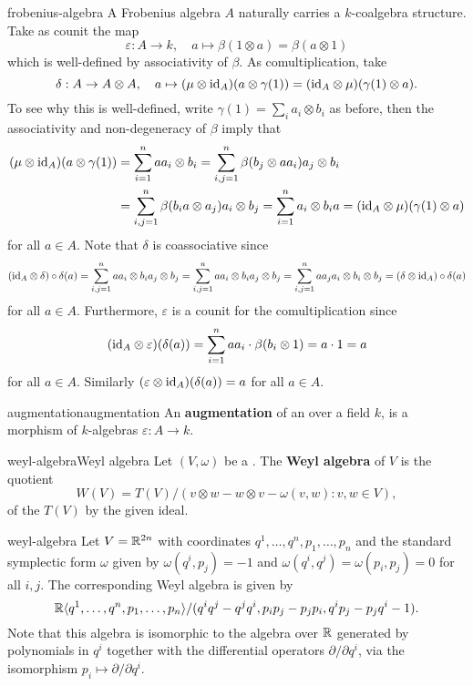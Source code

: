 \begin{example}{frobenius-algebra}
    A Frobenius algebra $A$ naturally carries a $k$-coalgebra structure. Take as counit the map
    \[ \varepsilon : A \to k, \quad a \mapsto \beta(1 \otimes a) = \beta(a \otimes 1) \]
    which is well-defined by associativity of $\beta$. As comultiplication, take
    \[ \delta : A \to A \otimes A, \quad a \mapsto (\mu \otimes \text{id}_A)(a \otimes \gamma(1)) = (\text{id}_A \otimes \mu)(\gamma(1) \otimes a) . \]
    To see why this is well-defined, write $\gamma(1) = \sum_i a_i \otimes b_i$ as before, then the associativity and non-degeneracy of $\beta$ imply that
    \[ \begin{aligned}
        (\mu \otimes \text{id}_A)(a \otimes \gamma(1)) &= \sum_{i = 1}^{n} a a_i \otimes b_i = \sum_{i,j = 1}^{n} \beta(b_j \otimes a a_i) a_j \otimes b_i \\ &= \sum_{i,j = 1}^{n} \beta(b_i a \otimes a_j) a_i \otimes b_j = \sum_{i = 1}^{n} a_i \otimes b_i a = (\text{id}_A \otimes \mu)(\gamma(1) \otimes a) 
    \end{aligned} \]
    for all $a \in A$. Note that $\delta$ is coassociative since
    \[ (\text{id}_A \otimes \delta) \circ \delta(a) = \sum_{i, j = 1}^{n} a a_i \otimes b_i a_j \otimes b_j = \sum_{i, j = 1}^{n} a a_i \otimes b_i a_j \otimes b_j = \sum_{i, j = 1}^{n} a a_j a_i \otimes b_i \otimes b_j = (\delta \otimes \text{id}_A) \circ \delta(a) \]
    for all $a \in A$. Furthermore, $\varepsilon$ is a counit for the comultiplication since
    \[ (\text{id}_A \otimes \varepsilon)(\delta(a)) = \sum_{i = 1}^{n} a a_i \cdot \beta(b_i \otimes 1) = a \cdot 1 = a \]
    for all $a \in A$. Similarly $(\varepsilon \otimes \text{id}_A)(\delta(a)) = a$ for all $a \in A$.
\end{example}

\begin{topic}{augmentation}{augmentation}
    An \textbf{augmentation} of an  over a field $k$, is a morphism of $k$-algebras $\varepsilon : A \to k$.
\end{topic}

\begin{topic}{weyl-algebra}{Weyl algebra}
    Let $(V, \omega)$ be a . The \textbf{Weyl algebra} of $V$ is the quotient
    \[ W(V) = T(V) / (v \otimes w - w \otimes v - \omega(v, w) : v, w \in V) , \]
    of the  $T(V)$ by the given ideal.
\end{topic}

\begin{example}{weyl-algebra}
    Let $V = \mathbb{R}^{2n}$ with coordinates $q^1, \ldots, q^n, p_1, \ldots, p_n$ and the standard symplectic form $\omega$ given by $\omega(q^i, p_j) = -1$ and $\omega(q^i, q^j) = \omega(p_i, p_j) = 0$ for all $i, j$. The corresponding Weyl algebra is given by
    \[ \mathbb{R} \langle q^1, \ldots, q^n, p_1, \ldots, p_n \rangle / (q^i q^j - q^j q^i, p_i p_j - p_j p_i, q^i p_j - p_j q^i - 1) . \]
    Note that this algebra is isomorphic to the algebra over $\mathbb{R}$ generated by polynomials in $q^i$ together with the differential operators $\partial/\partial q^i$, via the isomorphism $p_i \mapsto \partial/\partial q^i$.
\end{example}


